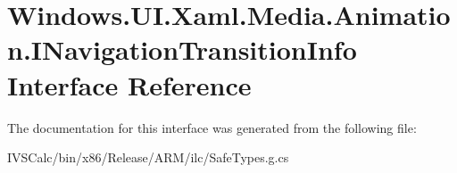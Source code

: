 \hypertarget{interface_windows_1_1_u_i_1_1_xaml_1_1_media_1_1_animation_1_1_i_navigation_transition_info}{}\section{Windows.\+U\+I.\+Xaml.\+Media.\+Animation.\+I\+Navigation\+Transition\+Info Interface Reference}
\label{interface_windows_1_1_u_i_1_1_xaml_1_1_media_1_1_animation_1_1_i_navigation_transition_info}


The documentation for this interface was generated from the following file\+:\begin{DoxyCompactItemize}
\item 
I\+V\+S\+Calc/bin/x86/\+Release/\+A\+R\+M/ilc/Safe\+Types.\+g.\+cs\end{DoxyCompactItemize}
